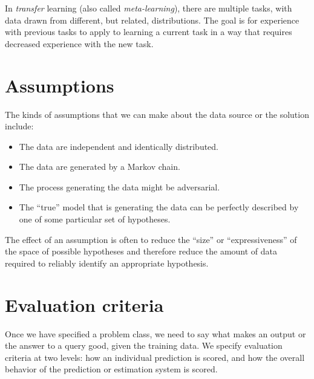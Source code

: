 In {\em transfer} learning (also called {\em meta-learning}), there
are multiple tasks, with data drawn
from different, but related, distributions.  The goal is for
experience with previous tasks to apply to learning a current task in
a way that requires decreased experience with the new task.

\section{Assumptions}

The kinds of assumptions that we can make about the data source or the solution include:
\begin{itemize}
  \item The data are independent and identically distributed.
  \item The data are generated by a Markov chain.
  \item The process generating the data might be adversarial.
  \item The ``true'' model that is generating the data can be perfectly described by one of some particular set of hypotheses.
\end{itemize}
The effect of an assumption is often to reduce the ``size'' or
``expressiveness''  of the space
of possible hypotheses and therefore reduce the amount of data
required to reliably identify an appropriate hypothesis.


\section{Evaluation criteria}
\label{sec-evaluation}

Once we have specified a problem class, we need to say what makes an
output or the answer to a query good, given the training data.  We specify evaluation criteria at two levels:  how an individual prediction is scored, and how the overall behavior of the prediction or estimation system is scored.

